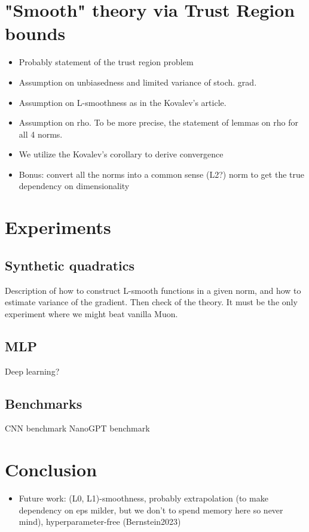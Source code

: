 \documentclass{article} %
\begin{document}
\section{"Smooth" theory via Trust Region bounds}
\begin{itemize}
    \item Probably statement of the trust region problem
    \item Assumption on unbiasedness and limited variance of stoch. grad.
    \item Assumption on L-smoothness as in the Kovalev's article.
    \item Assumption on rho. To be more precise, the statement of lemmas on rho for all 4 norms.
    \item We utilize the Kovalev's corollary to derive convergence
    \item Bonus: convert all the norms into a common sense (L2?) norm to get the true dependency on dimensionality
\end{itemize}


\section{Experiments}
\subsection{Synthetic quadratics}
Description of how to construct L-smooth functions in a given norm, and how to estimate variance of the gradient. Then check of the theory.
It must be the only experiment where we might beat vanilla Muon.
\subsection{MLP}
Deep learning?
\subsection{Benchmarks}
CNN benchmark
NanoGPT benchmark


    \section{Conclusion}
\begin{itemize}
    \item Future work: (L0, L1)-smoothness, probably extrapolation (to make dependency on eps milder, but we don't to spend memory here so never mind), hyperparameter-free (Bernstein2023)
\end{itemize}
\end{document}
